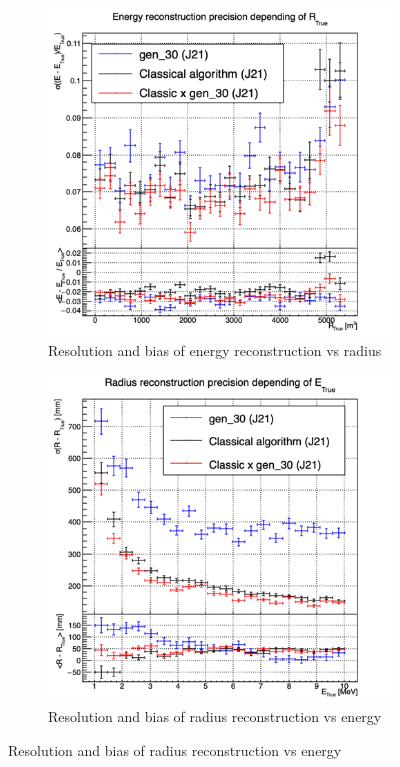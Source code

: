 \documentclass[../main.tex]{subfiles}
\begin{document}
{{\begin{figure}[ht]
\begin{subfigure}[t]{0.32\linewidth}
    \includegraphics[width=\linewidth]{images/jcnn/vic_cnn/multi_vic_cnn_Cx30_MESBvRTC.png}
    \caption{Resolution and bias of energy reconstruction vs radius}
    \label{fig:jcnn:vic_cnn:multi_vic_cnn_Cx30_MESBvRTC}
  \end{subfigure}
  \begin{subfigure}[t]{0.32\linewidth}
    \centering
    \includegraphics[width=\linewidth]{images/jcnn/vic_cnn/multi_vic_cnn_Cx30_MSBvETC.png}
    \caption{Resolution and bias of radius reconstruction vs energy}
    \label{fig:jcnn:vic_cnn:multi_vic_cnn_Cx30_MSBvETC}
  \end{subfigure}



\end{figure}}}
\end{document}

